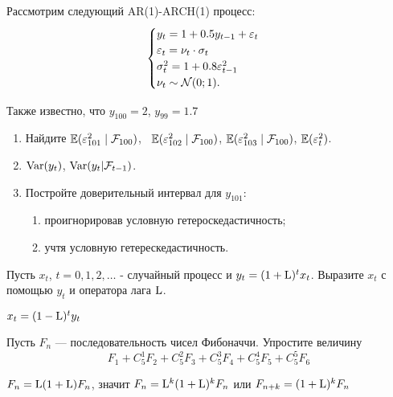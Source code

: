 \begin{problem}
Рассмотрим следующий AR(1)-ARCH(1) процесс:
\[
\begin{cases}
  y_{t}=1+0.5y_{t-1}+\varepsilon_{t} \\
  \varepsilon_{t}=\nu_{t}\cdot \sigma_{t} \\
  \sigma^{2}_{t}=1+0.8\varepsilon^{2}_{t-1} \\
  \nu_t \sim \mathcal{N}(0;1). \\
\end{cases}
\]

Также известно, что $y_{100}=2$, $y_{99}=1.7$
\begin{enumerate}
\item Найдите $\mathbb{E}(\varepsilon^{2}_{101} \mid \mathcal{F}_{100})$, \
$\mathbb{E}(\varepsilon^{2}_{102} \mid \mathcal{F}_{100})$, $\mathbb{E}(\varepsilon^{2}_{103} \mid \mathcal{F}_{100})$, 
$\mathbb{E}(\varepsilon^{2}_{t})$.
\item $\operatorname{Var}(y_{t})$, $\operatorname{Var}(y_{t}|\mathcal{F}_{t-1})$.
\item Постройте доверительный интервал для $y_{101}$:
\begin{enumerate}
\item проигнорировав условную гетероскедастичность;
\item учтя условную гетерескедастичность.
\end{enumerate}
\end{enumerate}


\begin{sol}
\end{sol}
\end{problem}




\begin{problem}
Пусть $x_{t}$, $t=0,1,2,\ldots$ - случайный процесс и $y_{t}=(1+\mathrm{L} )^{t}x_{t}$.
Выразите $x_{t}$ с помощью $y_{t}$ и оператора лага $\mathrm{L} $.


\begin{sol}
$x_{t}=(1-\mathrm{L} )^{t}y_{t}$
\end{sol}
\end{problem}



\begin{problem}
Пусть $ F_{n} $ — последовательность чисел Фибоначчи. Упростите величину
\[ F_{1}+C^{1}_{5}F_{2}+C^{2}_{5}F_{3}+C^{3}_{5}F_{4}+C^{4}_{5}F_{5}+C^{5}_{5}F_{6} \]


\begin{sol}
$ F_{n}=\mathrm{L} (1+\mathrm{L} )F_{n} $, значит $ F_{n}=\mathrm{L} ^{k}(1+\mathrm{L} )^{k}F_{n} $ или $ F_{n+k}=(1+\mathrm{L} )^{k}F_{n} $
\end{sol}
\end{problem}




